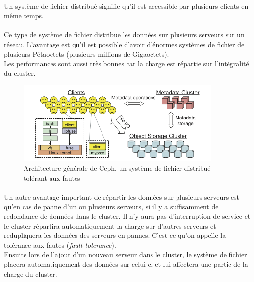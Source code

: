 \paragraph*{}
Un système de fichier distribué signifie qu'il est accessible par plusieurs clients en même temps.

\paragraph*{}
Ce type de système de fichier distribue les données sur plusieurs serveurs sur un réseau. L'avantage est qu'il est possible d'avoir d'énormes systèmes de fichier de plusieurs
Pétaoctets (plusieurs millions de Gigaoctets).\\
Les performances sont aussi très bonnes car la charge est répartie sur l'intégralité du cluster.

\begin{figure}[H]
\centering
\includegraphics[width=0.9\textwidth]{resource/img/ceph-architecture}
\caption{Architecture générale de Ceph, un système de fichier distribué tolérant aux fautes}
\label{archionescalein}
\end{figure}

\paragraph*{}
Un autre avantage important de répartir les données sur plusieurs serveurs est qu'en cas de panne d'un ou plusieurs serveurs, si il y a suffisamment de redondance
de données dans le cluster. Il n'y aura pas d'interruption de service et le cluster répartira automatiquement la charge sur d'autres serveurs et redupliquera les données
des serveurs en pannes. C'est ce qu'on appelle la tolérance aux fautes (\emph{fault tolerance}).\\
Ensuite lors de l'ajout d'un nouveau serveur dans le cluster, le système de fichier placera automatiquement des données sur celui-ci et lui affectera une
partie de la charge du cluster.

